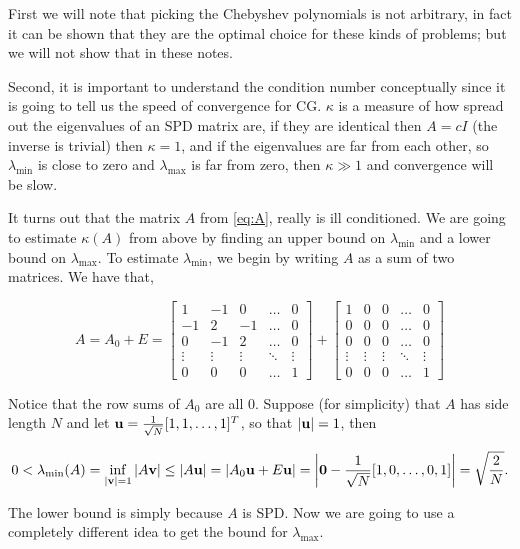 \documentclass{article}
\newcommand{\bu}{{\bf u}}
\newcommand{\bv}{{\bf v}}
\newcommand{\beq}{\begin{equation}}
\newcommand{\eeq}{\end{equation}}
\theoremstyle{remark}
\begin{document}
First we will note that picking the Chebyshev polynomials is not arbitrary, in fact it can be shown that they are the optimal choice for these kinds of problems; but we will not show that in these notes. 

Second, it is important to understand the condition number conceptually since it is going to tell us the speed of convergence for CG.  $\kappa$ is a measure of how spread out the eigenvalues of an SPD matrix are, if they are identical then $A = cI$ (the inverse is trivial) then $\kappa = 1$, and if the eigenvalues are far from each other, so $\lambda_{\min}$ is close to zero and $\lambda_{\max}$ is far from zero, then $\kappa \gg 1$ and convergence will be slow. 

It turns out that the matrix $A$ from \eqref{eq:A}, really is ill conditioned.  We are going to estimate $\kappa(A)$ from above by finding an upper bound on $\lambda_{\min}$ and a lower bound on $\lambda_{\max}$. To estimate $\lambda_{\min}$, we begin by writing $A$ as a sum of two matrices. We have that,

\beq
A = A_0 + E = \begin{bmatrix} 
1 & -1 & 0 & \dots & 0   \\
-1  & 2 & -1 & \dots & 0  \\
0  &  -1 &  2 & \dots & 0 \\
\vdots & \vdots & \vdots & \ddots & \vdots \\
0 & 0 & 0 & \dots & 1
\end{bmatrix}
+ \begin{bmatrix}
1 & 0 & 0 & \dots & 0   \\
0  & 0 & 0 & \dots & 0  \\
0  & 0 & 0 & \dots & 0 \\
\vdots & \vdots & \vdots & \ddots & \vdots \\
0 & 0 & 0 & \dots & 1
\end{bmatrix}
\eeq

Notice that the row sums of $A_0$ are all $0$. Suppose (for simplicity) that $A$ has side length $N$ and let $\bu =  \frac{1}{\sqrt{N}}[1, 1, \dots, 1]^T$, so that $|\bu| = 1$, then  

\beq
\label{eq:lambdamin}
 0 < \lambda_{\min}(A) = \inf_{|\bv| = 1}|A\bv| \leq |A\bu| = |A_0 \bu + E\bu| = \left|{\bf 0} - \frac{1}{\sqrt{N}}[1, 0, \dots , 0 ,1]\right| = \sqrt{\frac{2}{N}}.
\eeq

The lower bound is simply because $A$ is SPD. Now we are going to use a completely different idea to get the bound for $\lambda_{\max}$. 
\end{document}
